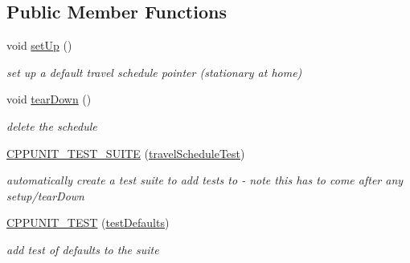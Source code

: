 \subsection*{Public Member Functions}
\begin{DoxyCompactItemize}
\item 
\mbox{\label{classtravelScheduleTest_ad43113c0f75ff6969e57fb865975d133}} 
void \mbox{\hyperlink{classtravelScheduleTest_ad43113c0f75ff6969e57fb865975d133}{set\+Up}} ()
\begin{DoxyCompactList}\small\item\em set up a default travel schedule pointer (stationary at home) \end{DoxyCompactList}\item 
\mbox{\label{classtravelScheduleTest_a69320630d353404c79e158289c5d73f4}} 
void \mbox{\hyperlink{classtravelScheduleTest_a69320630d353404c79e158289c5d73f4}{tear\+Down}} ()
\begin{DoxyCompactList}\small\item\em delete the schedule \end{DoxyCompactList}\item 
\mbox{\label{classtravelScheduleTest_a019e7ca232e9bdbe438ac24da88dc158}} 
\mbox{\hyperlink{classtravelScheduleTest_a019e7ca232e9bdbe438ac24da88dc158}{C\+P\+P\+U\+N\+I\+T\+\_\+\+T\+E\+S\+T\+\_\+\+S\+U\+I\+TE}} (\mbox{\hyperlink{classtravelScheduleTest}{travel\+Schedule\+Test}})
\begin{DoxyCompactList}\small\item\em automatically create a test suite to add tests to -\/ note this has to come after any setup/tear\+Down \end{DoxyCompactList}\item 
\mbox{\label{classtravelScheduleTest_ab715d40df88ffedf9f304c9aa7b17b71}} 
\mbox{\hyperlink{classtravelScheduleTest_ab715d40df88ffedf9f304c9aa7b17b71}{C\+P\+P\+U\+N\+I\+T\+\_\+\+T\+E\+ST}} (\mbox{\hyperlink{classtravelScheduleTest_a20320a46b0a0a9cd70e643f1ebe0ee0a}{test\+Defaults}})
\begin{DoxyCompactList}\small\item\em add test of defaults to the suite \end{DoxyCompactList}\item 

\end{DoxyCompactItemize}

